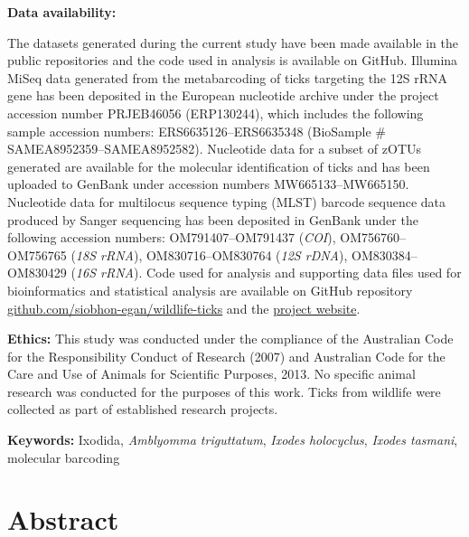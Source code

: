 \documentclass[a4paper, nobind]{templates/ociamthesis}
\begin{document}
\vspace{5mm}

\textbf{Data availability:}

The datasets generated during the current study have been made available in the public repositories and the code used in analysis is available on GitHub.
Illumina MiSeq data generated from the metabarcoding of ticks targeting the 12S rRNA gene has been deposited in the European nucleotide archive under the project accession number PRJEB46056 (ERP130244), which includes the following sample accession numbers: ERS6635126--ERS6635348 (BioSample \# SAMEA8952359--SAMEA8952582).
Nucleotide data for a subset of zOTUs generated are available for the molecular identification of ticks and has been uploaded to GenBank under accession numbers MW665133--MW665150.
Nucleotide data for multilocus sequence typing (MLST) barcode sequence data produced by Sanger sequencing has been deposited in GenBank under the following accession numbers: OM791407--OM791437 (\emph{COI}), OM756760--OM756765 (\emph{18S rRNA}), OM830716--OM830764 (\emph{12S rDNA}), OM830384--OM830429 (\emph{16S rRNA}).
Code used for analysis and supporting data files used for bioinformatics and statistical analysis are available on GitHub repository \href{https://github.com/siobhon-egan/wildlife-ticks}{github.com/siobhon-egan/wildlife-ticks} and the \href{https://siobhonlegan.com/wildlife-ticks/}{project website}.

\vspace{5mm}

\textbf{Ethics:}
This study was conducted under the compliance of the Australian Code for the Responsibility Conduct of Research (2007) and Australian Code for the Care and Use of Animals for Scientific Purposes, 2013.
No specific animal research was conducted for the purposes of this work. Ticks from wildlife were collected as part of established research projects.

\textbf{Keywords:} Ixodida, \emph{Amblyomma triguttatum}, \emph{Ixodes holocyclus}, \emph{Ixodes tasmani}, molecular barcoding

\newpage

\hypertarget{abstract}{%
\section{Abstract}\label{abstract}}
\end{document}
